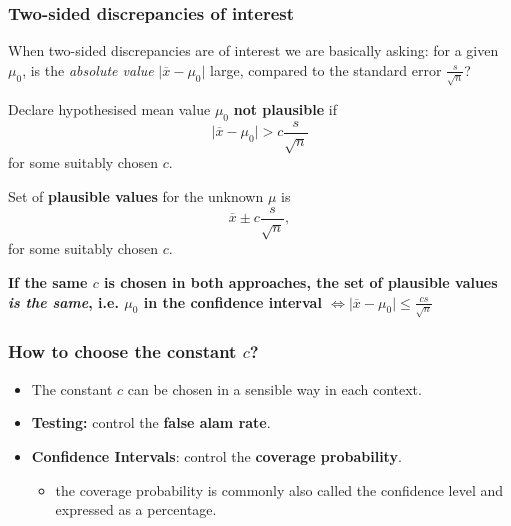 \documentclass[a4paper]{article}
\begin{document}
\subsubsection{Two-sided discrepancies of interest}
When two-sided discrepancies are of interest we are basically asking: for a given \( \mu_0 \), is the \textit{absolute value} \( \lvert \overline{x} - \mu_0  \rvert \) large, compared to the standard error \( \frac{s}{\sqrt{n}} \)?
\begin{tcbraster}[raster columns = 2, raster halign = center, raster equal height=rows, enhanced, sharp corners, colback=white, coltitle=black, colbacktitle=myblue!25, sharpish corners, fonttitle=\bfseries, boxrule=0pt, borderline west={2pt}{0pt}{myblue}]
	\begin{tcolorbox}[title=\( t \)-test Approach]
		Declare hypothesised mean value \( \mu_0 \) \textbf{not plausible} if
		\[
			\lvert \overline{x} - \mu_0 \rvert > c \frac{s}{\sqrt{n}}
		\]
		for some suitably chosen \( c \).
	\end{tcolorbox}
	\begin{tcolorbox}[title=Confidence Interval Approach]
		Set of \textbf{plausible values} for the unknown \( \mu \) is
		\[
			\overline{x} \pm c \frac{s}{\sqrt{n}},
		\]
		for some suitably chosen \( c \).
	\end{tcolorbox}
	\begin{goldbox}
		\textbf{If the same \( c \) is chosen in both approaches, the set of plausible values \textit{is the same}, i.e. \( \mu_0 \) in the confidence interval \( \Leftrightarrow \lvert \overline{x} - \mu_0 \rvert \leq \frac{cs}{\sqrt{n}} \) }
	\end{goldbox}
\end{tcbraster}
\subsubsection{How to choose the constant \( c \)?}
\begin{itemize}
	\item The constant \( c \) can be chosen in a sensible way in each context.
	\item \textcolor{mygreen}{\textbf{Testing:}} control the \textcolor{mygreen}{\textbf{false alam rate}}.
	\item \textcolor{myred}{\textbf{Confidence Intervals}}: control the \textcolor{myred}{\textbf{coverage probability}}.
	\begin{itemize}
		\item the coverage probability is commonly also called the confidence level and expressed as a percentage.
	\end{itemize}
\end{itemize}
\end{document}
